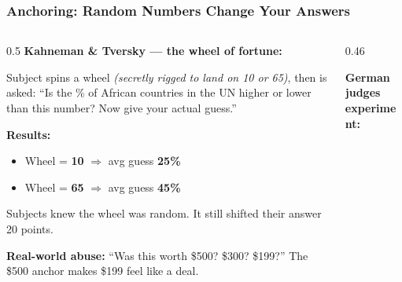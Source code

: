 \documentclass[aspectratio=169]{beamer}
\begin{document}
\begin{frame}
\frametitle{Anchoring: Random Numbers Change Your Answers}

\begin{columns}[T]
\begin{column}{0.5\textwidth}
\vspace{0.1cm}
{\small\textbf{Kahneman \& Tversky --- the wheel of fortune:}}

\vspace{0.05cm}
{\scriptsize Subject spins a wheel \textit{(secretly rigged to land on 10 or 65)}, then is asked: ``Is the \% of African countries in the UN higher or lower than this number? Now give your actual guess.''}

\vspace{0.1cm}
{\small\textbf{Results:}}
\begin{itemize}\setlength{\itemsep}{0pt}
  \item Wheel = \textbf{10} $\Rightarrow$ avg guess \textbf{25\%}
  \item Wheel = \textbf{65} $\Rightarrow$ avg guess \textbf{45\%}
\end{itemize}

\vspace{0.05cm}
{\scriptsize \textcolor{warnred}{Subjects knew the wheel was random. It still shifted their answer 20 points.}}

\vspace{0.1cm}
{\scriptsize \textbf{Real-world abuse:} ``Was this worth \$500? \$300? \$199?'' The \$500 anchor makes \$199 feel like a deal.}
\end{column}
\begin{column}{0.46\textwidth}
\vspace{0.1cm}
\begin{center}
{\small \textbf{German judges experiment:}}
\vspace{0.1cm}



\end{center}
\end{column}
\end{columns}
\end{frame}
\end{document}
